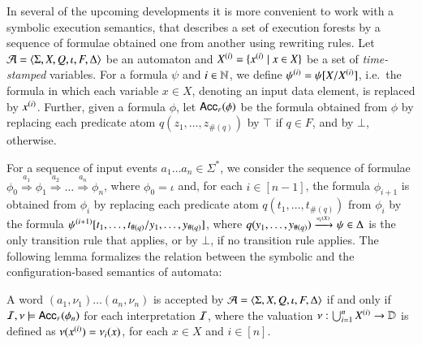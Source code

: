 \documentclass{llncs}
\begin{document}
In several of the upcoming developments it is more convenient to work
with a symbolic execution semantics, that describes a set of execution
forests by a sequence of formulae obtained one from another using
rewriting rules. Let $\mathcal{A} = \langle \Sigma,X,Q,\iota,F,\Delta \rangle$ be an
automaton and ${X}^{({i})} = \{ {x}^{({i})} \mid x \in X \}$ be a
set of \emph{time-stamped} variables. For a formula $\psi$ and $i \in
{\bf \mathbb{N}}$, we define ${\psi}^{({i})} = \psi[X/{X}^{({i})}]$, i.e.\ the
formula in which each variable $x \in X$, denoting an input data
element, is replaced by ${x}^{({i})}$. Further, given a formula
$\phi$, let $\mathsf{Acc}_{\scriptscriptstyle{F}}({\phi})$ be the formula obtained from $\phi$ by
replacing each predicate atom $q(z_1,\ldots,z_{\#(q)})$ by $\top$ if
$q \in F$, and by $\bot$, otherwise.

For a sequence of input events $a_1 \ldots a_n \in \Sigma^*$, we
consider the sequence of formulae \(\phi_0 \stackrel{a_1}{\Rightarrow}
\phi_1 \stackrel{a_2}{\Rightarrow} \ldots \stackrel{a_n}{\Rightarrow}
\phi_n\), where $\phi_0 = \iota$ and, for each $i \in [n-1]$, the
formula $\phi_{i+1}$ is obtained from $\phi_i$ by replacing each
predicate atom $q(t_1,\ldots,t_{\#(q)})$ from $\phi_i$ by the formula
${\psi}^{({i+1})}[t_1, \ldots, t_{\#(q)}/y_1,\ldots,y_{\#(q)}]$,
where $q(y_1,\ldots,y_{\#(q)}) \xrightarrow{{\scriptscriptstyle a_i(X)}}_{{\scriptstyle }} \psi \in \Delta$ is
the only transition rule that applies, or by $\bot$, if no transition
rule applies. The following lemma formalizes the relation between the
symbolic and the configuration-based semantics of automata:

\begin{lemma}\label{lemma:symbolic-execution}
  A word $(a_1,\nu_1) \ldots (a_n,\nu_n)$ is accepted by $\mathcal{A} =
  \langle \Sigma,X,Q,\iota,F,\Delta \rangle$ if and only if $\mathcal{I},\nu \models
  \mathsf{Acc}_{\scriptscriptstyle{F}}({\phi_n})$ for each interpretation $\mathcal{I}$, where the
  valuation $\nu : \bigcup_{i=1}^n {X}^{({i})} \rightarrow \mathbb{D}$ is
  defined as $\nu({x}^{({i})}) = \nu_i(x)$, for each $x \in X$ and $i
  \in [n]$.
\end{lemma}
\end{document}
